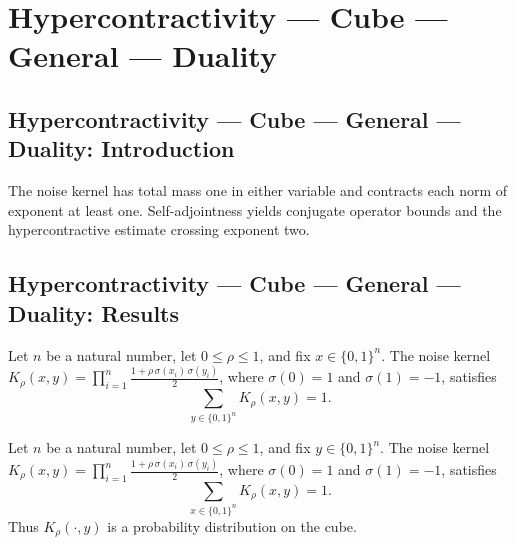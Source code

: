 \section{Hypercontractivity --- Cube --- General --- Duality}
\subsection*{Hypercontractivity --- Cube --- General --- Duality: Introduction}
The noise kernel has total mass one in either variable and contracts each norm of exponent at least one. Self-adjointness yields conjugate operator bounds and the hypercontractive estimate crossing exponent two.

\subsection*{Hypercontractivity --- Cube --- General --- Duality: Results}

\begin{lemma}
\leanok
{}
\label{BooleanAnalysis.Hypercontractivity.noiseKernel_sum_right}
Let $n$ be a natural number, let $0\le\rho\le1$, and fix $x\in\{0,1\}^n$.
The noise kernel
$K_\rho(x,y)=\prod_{i=1}^{n}\frac{1+\rho\,\sigma(x_i)\,\sigma(y_i)}{2}$,
where $\sigma(0)=1$ and $\sigma(1)=-1$, satisfies
\[
  \sum_{y\in\{0,1\}^n}K_\rho(x,y)=1.
\]
\end{lemma}

\begin{lemma}
\leanok
{}
\label{BooleanAnalysis.Hypercontractivity.noiseKernel_sum_left}
Let $n$ be a natural number, let $0\le\rho\le1$, and fix $y\in\{0,1\}^n$.
The noise kernel
$K_\rho(x,y)=\prod_{i=1}^{n}\frac{1+\rho\,\sigma(x_i)\,\sigma(y_i)}{2}$,
where $\sigma(0)=1$ and $\sigma(1)=-1$, satisfies
\[
  \sum_{x\in\{0,1\}^n}K_\rho(x,y)=1.
\]
Thus $K_\rho(\cdot,y)$ is a probability distribution on the cube.
\end{lemma}

